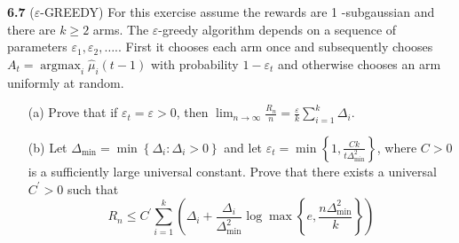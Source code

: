 \noindent\textbf{6.7} ($\varepsilon$-GREEDY) For this exercise assume the rewards are 1 -subgaussian and there are $k \geq 2$ arms. The $\varepsilon$-greedy algorithm depends on a sequence of parameters $\varepsilon_{1}, \varepsilon_{2}, \ldots . .$ First it chooses each arm once and subsequently chooses $A_{t}=\operatorname{argmax}_{i} \hat{\mu}_{i}(t-1)$ with probability $1-\varepsilon_{t}$ and otherwise chooses an arm uniformly at random.
\begin{enumerate}
    \item[(a)] Prove that if $\varepsilon_{t}=\varepsilon>0$, then $\lim _{n \rightarrow \infty} \frac{R_{n}}{n}=\frac{\varepsilon}{k} \sum_{i=1}^{k} \Delta_{i}$.
    \item[(b)] Let $\Delta_{\min }=\min \left\{\Delta_{i}: \Delta_{i}>0\right\}$ and let $\varepsilon_{t}=\min \left\{1, \frac{C k}{t \Delta_{\min }^{2}}\right\}$, where $C>0$ is a sufficiently large universal constant. Prove that there exists a universal $C^{\prime}>0$ such that
    $$
    R_{n} \leq C^{\prime} \sum_{i=1}^{k}\left(\Delta_{i}+\frac{\Delta_{i}}{\Delta_{\min }^{2}} \log \max \left\{e, \frac{n \Delta_{\min }^{2}}{k}\right\}\right)
    $$
\end{enumerate}

